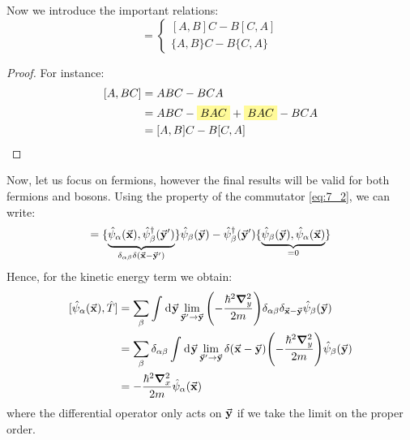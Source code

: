 \documentclass[../main/main.tex]{subfiles}
\begin{document}
Now we introduce the important relations: 
\begin{equation}
[A,BC] =
  \begin{cases}
   [A,B]C - B[C,A]\\
   \{A,B\}C - B\{C,A\}
  \end{cases}
  \label{eq:7_2}
\end{equation}
\begin{proof}
For instance:
\begin{equation*}
\begin{split}
  [A,BC]&= ABC-BCA   \\
        &= ABC - \mathcolorbox{yellow!40}{BAC} + \mathcolorbox{yellow!40}{BAC} - BCA \\
        &= [A,B]C - B[C,A]
\end{split}
\end{equation*}
\end{proof}
Now, let us focus on fermions, however the final results will be valid for both fermions and bosons. Using the property of the commutator \eqref{eq:7_2}, we can write:
\begin{equation*}
  [\hat{\psi }_ \alpha (\va{x}), \hat{\psi }_ \beta  ^\dag (\va{y}') \hat{\psi }_ \beta (\va{y})   ] =
 \{  \underbrace{  \hat{\psi }_ \alpha  (\va{x}),  \hat{\psi }_ \beta ^\dag  (\va{y}')  }_{\delta _{\alpha \beta } \delta (\va{x}-\va{y}')}
 \}  \hat{\psi }_ \beta  (\va{y})
 - \hat{\psi }_ \beta  ^\dag (\va{y}') \{ \underbrace{\hat{\psi }_ \beta  (\va{y}), \hat{\psi }_ \alpha  (\va{x}) }_{=0}  \}
\end{equation*}
Hence, for the kinetic energy term we obtain:
\begin{equation}
\begin{split}
  [\hat{\psi }_ \alpha (\va{x}),\hat{T}  ] &=
  \sum_{\beta }^{} \int_{}^{} \dd[]{\va{y}} \lim_{\va{y}' \rightarrow \va{y}} \qty(- \frac{\hbar ^2 \grad ^2_y}{2m}) \delta _{\alpha \beta } \delta _{\va{x}-\va{y}} \hat{\psi }_ \beta (\va{y})        \\
  &= \sum_{\beta }^{} \delta _{\alpha \beta } \int_{}^{} \dd[]{\va{y}} \lim_{\va{y}' \rightarrow \va{y}}  \delta (\va{x}-\va{y})
  \qty(- \frac{\hbar ^2 \grad ^2_y}{2m}) \hat{\psi }_ \beta (\va{y})     \\
  & = - \frac{\hbar ^2 \grad ^2_x}{2m} \hat{\psi }_ \alpha (\va{x})
\end{split}
\end{equation}
where the differential operator only acts on \( \va{y} \) if we take the limit on the proper order.
\end{document}
